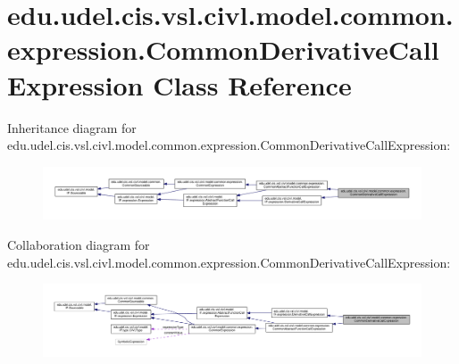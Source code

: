 \hypertarget{classedu_1_1udel_1_1cis_1_1vsl_1_1civl_1_1model_1_1common_1_1expression_1_1CommonDerivativeCallExpression}{}\section{edu.\+udel.\+cis.\+vsl.\+civl.\+model.\+common.\+expression.\+Common\+Derivative\+Call\+Expression Class Reference}
\label{classedu_1_1udel_1_1cis_1_1vsl_1_1civl_1_1model_1_1common_1_1expression_1_1CommonDerivativeCallExpression}


Inheritance diagram for edu.\+udel.\+cis.\+vsl.\+civl.\+model.\+common.\+expression.\+Common\+Derivative\+Call\+Expression\+:
\nopagebreak
\begin{figure}[H]
\begin{center}
\leavevmode
\includegraphics[width=350pt]{classedu_1_1udel_1_1cis_1_1vsl_1_1civl_1_1model_1_1common_1_1expression_1_1CommonDerivativeCallExpression__inherit__graph}
\end{center}
\end{figure}


Collaboration diagram for edu.\+udel.\+cis.\+vsl.\+civl.\+model.\+common.\+expression.\+Common\+Derivative\+Call\+Expression\+:
\nopagebreak
\begin{figure}[H]
\begin{center}
\leavevmode
\includegraphics[width=350pt]{classedu_1_1udel_1_1cis_1_1vsl_1_1civl_1_1model_1_1common_1_1expression_1_1CommonDerivativeCallExpression__coll__graph}
\end{center}
\end{figure}
